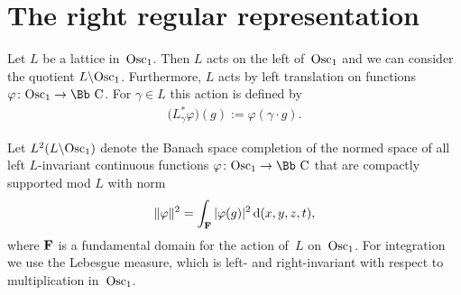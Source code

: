 \documentclass[pdftex]{sigma}
\newcommand\CC{{\mbox{\Bb C}}}
\newcommand\bF{\textbf{{\rm \textbf{F}}}}
\newcommand\ph{\varphi}
\newcommand{\Osc}{{\rm Osc}}
\numberwithin{equation}{section}
\begin{document}
\section{The right regular representation}

Let $L$ be a lattice in~$\Osc_1$.
Then $L$ acts on the left of~$\Osc_1$ and we can consider the quotient $L\backslash \Osc_1$.
Furthermore, $L$ acts by left translation on functions $\ph\colon \Osc_1\to\CC$. For $\gamma\in L$ this action is defined by
\begin{gather*}
\big(L_\gamma^* \ph\big)(g):=\ph(\gamma\cdot g).
\end{gather*}

Let $L^2(L\backslash \Osc_1)$ denote the Banach space completion of the normed space of all left $L$-invariant continuous functions $\varphi\colon \Osc_1\rightarrow \CC$ that are compactly supported mod $L$ with norm
\begin{gather*}
\lVert\varphi\rVert^2=\int_\bF|\varphi(g)|^2 \,{\rm d}(x,y,z,t),
\end{gather*}
where $\bF$ is a fundamental domain for the action of~$L$ on~$\Osc_1$. For integration we use the Lebesgue measure, which is left- and right-invariant with respect to multiplication in~$\Osc_1$.
\end{document}
